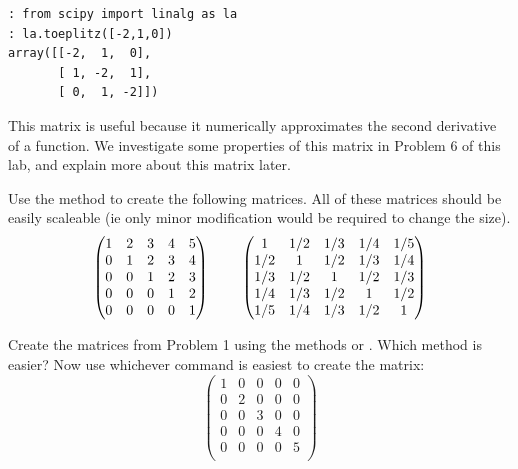 \begin{lstlisting}
: from scipy import linalg as la
: la.toeplitz([-2,1,0])
array([[-2,  1,  0],
       [ 1, -2,  1],
       [ 0,  1, -2]])
\end{lstlisting}

This matrix is useful because it numerically approximates the second derivative of a function. We investigate some properties of this matrix in Problem 6 of this lab, and explain more about this matrix later.

\begin{problem}
Use the  method to create the following matrices. All of these matrices should be easily scaleable (ie only minor modification would be required to change the size).
\[
\begin{pmatrix}
1&2&3&4&5\\
0&1&2&3&4\\
0&0&1&2&3 \\
0&0&0&1&2 \\
0&0&0&0&1 \\
\end{pmatrix}
\hspace{8mm}
\begin{pmatrix}
1&1/2&1/3 & 1/4 &1/5\\
1/2&1&1/2&1/3&1/4\\
1/3&1/2&1&1/2&1/3 \\
1/4&1/3&1/2&1&1/2 \\
1/5&1/4&1/3&1/2&1 \\
\end{pmatrix}
\]
\end{problem}

\begin{problem}
Create the matrices from Problem 1 using the methods  or . Which method is easier? Now use whichever command is easiest to create the matrix:
\[
\begin{pmatrix}
1&0&0&0&0\\
0&2&0&0&0\\
0&0&3&0&0 \\
0&0&0&4&0 \\
0&0&0&0&5 \\
\end{pmatrix}
\]
\end{problem}
 

